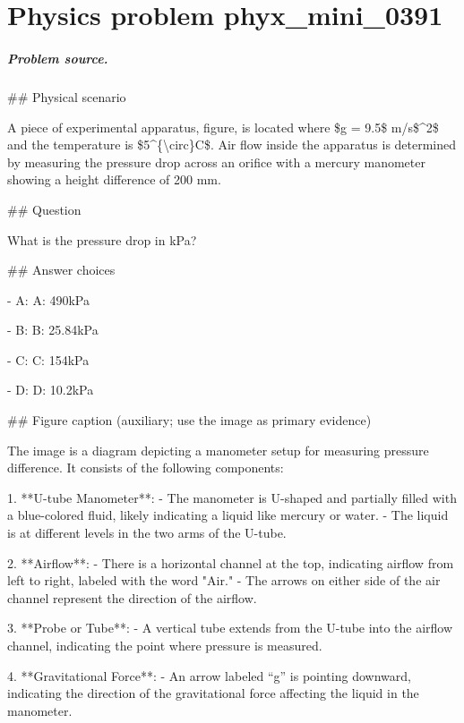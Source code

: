
\chapter{Physics problem phyx\_mini\_0391}
\label{ch:PhyXMiniProblems_problem_phyx_mini_0391}

\paragraph{Problem source.}
\#\# Physical scenario

A piece of experimental apparatus, figure, is located where \$g = 9.5\$ m/s\$\textasciicircum{}2\$ and the temperature is \$5\textasciicircum{}\{\textbackslash{}circ\}C\$. Air flow inside the apparatus is determined by measuring the pressure drop across an orifice with a mercury manometer showing a height difference of 200 mm.

\#\# Question

What is the pressure drop in kPa?

\#\# Answer choices

- A: A: 490kPa

- B: B: 25.84kPa

- C: C: 154kPa

- D: D: 10.2kPa

\#\# Figure caption (auxiliary; use the image as primary evidence)

The image is a diagram depicting a manometer setup for measuring pressure difference. It consists of the following components:

1. **U-tube Manometer**: 
   - The manometer is U-shaped and partially filled with a blue-colored fluid, likely indicating a liquid like mercury or water.
   - The liquid is at different levels in the two arms of the U-tube.

2. **Airflow**: 
   - There is a horizontal channel at the top, indicating airflow from left to right, labeled with the word "Air."
   - The arrows on either side of the air channel represent the direction of the airflow.

3. **Probe or Tube**:
   - A vertical tube extends from the U-tube into the airflow channel, indicating the point where pressure is measured.

4. **Gravitational Force**:
   - An arrow labeled “g” is pointing downward, indicating the direction of the gravitational force affecting the liquid in the manometer.


